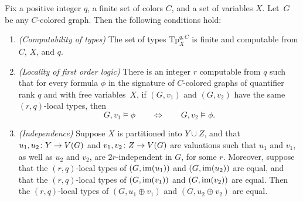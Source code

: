 \begin{proposition}\label{pro:gaifman}
	Fix a positive integer $q$, a finite set of colors $C$, and a set of variables $X$. Let~$G$ be any $C$-colored graph. Then the following conditions hold:
 \begin{enumerate}[(1)]
 	\item \emph{(Computability of types)} The set of types $\mathrm{Tp}^{q,C}_X$ is finite and computable from $C$, $X$, and $q$.

	\item \emph{(Locality of first order logic)} There is an integer $r$ computable from $q$ such that for every formula $\phi$ in the signature of $C$-colored graphs  
	of quantifier rank $q$ and with free variables~$X$,	
  if $(G,v_1)$ and $(G,v_2)$ have the same $(r,q)$-local types,
	then
	 $$G,v_1\models \phi\qquad\iff \qquad G,v_2\models \phi.$$



	 \item \emph{(Independence)} Suppose $X$ is partitioned into $Y\cup Z$, 
	 and that $u_1,u_2\colon Y\to V(G)$ and $v_1,v_2\colon Z\to V(G)$ are valuations
   such that  $u_1$ and $v_1$, as well as $u_2$ and $v_2$,
   are $2r$-independent in $G$, for some $r$.
   Moreover, suppose that the $(r,q)$-local types of $(G,\mathrm{im}(u_1))$ and $(G,\mathrm{im}(u_2))$ are equal,
   and that the $(r,q)$-local types of $(G,\mathrm{im}(v_1))$ and $(G,\mathrm{im}(v_2))$ are equal.
   Then the $(r,q)$-local types of $(G,u_1\oplus v_1)$ and $(G,u_2\oplus v_2)$ are equal.
 \end{enumerate}
\end{proposition}


